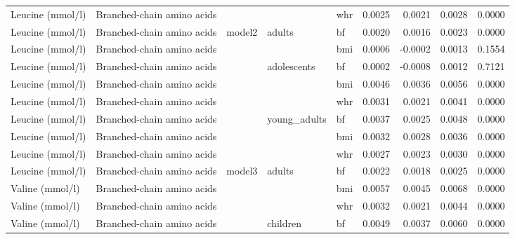 \documentclass[11pt,twoside]{bristolthesis}
\begin{document}
\begin{longtable}[t]{lllllrrrr}
\cmidrule{1-2}
\cmidrule{5-9}\nopagebreak
Leucine (mmol/l) & Branched-chain amino acids &  &  & whr & 0.0025 & 0.0021 & 0.0028 & 0.0000\\
\cmidrule{1-2}
\cmidrule{5-9}\nopagebreak
Leucine (mmol/l) & Branched-chain amino acids & \multirow{-11}{*}{\raggedright\arraybackslash model2} & \multirow{-3}{*}{\raggedright\arraybackslash adults} & bf & 0.0020 & 0.0016 & 0.0023 & 0.0000\\
\cmidrule{1-9}\pagebreak[0]
Leucine (mmol/l) & Branched-chain amino acids &  &  & bmi & 0.0006 & -0.0002 & 0.0013 & 0.1554\\
\cmidrule{1-2}
\cmidrule{5-9}\nopagebreak
Leucine (mmol/l) & Branched-chain amino acids &  & \multirow{-2}{*}{\raggedright\arraybackslash adolescents} & bf & 0.0002 & -0.0008 & 0.0012 & 0.7121\\
\cmidrule{1-2}
\cmidrule{4-9}\nopagebreak
Leucine (mmol/l) & Branched-chain amino acids &  &  & bmi & 0.0046 & 0.0036 & 0.0056 & 0.0000\\
\cmidrule{1-2}
\cmidrule{5-9}\nopagebreak
Leucine (mmol/l) & Branched-chain amino acids &  &  & whr & 0.0031 & 0.0021 & 0.0041 & 0.0000\\
\cmidrule{1-2}
\cmidrule{5-9}\nopagebreak
Leucine (mmol/l) & Branched-chain amino acids &  & \multirow{-3}{*}{\raggedright\arraybackslash young\_adults} & bf & 0.0037 & 0.0025 & 0.0048 & 0.0000\\
\cmidrule{1-2}
\cmidrule{4-9}\nopagebreak
Leucine (mmol/l) & Branched-chain amino acids &  &  & bmi & 0.0032 & 0.0028 & 0.0036 & 0.0000\\
\cmidrule{1-2}
\cmidrule{5-9}\nopagebreak
Leucine (mmol/l) & Branched-chain amino acids &  &  & whr & 0.0027 & 0.0023 & 0.0030 & 0.0000\\
\cmidrule{1-2}
\cmidrule{5-9}\nopagebreak
Leucine (mmol/l) & Branched-chain amino acids & \multirow{-8}{*}{\raggedright\arraybackslash model3} & \multirow{-3}{*}{\raggedright\arraybackslash adults} & bf & 0.0022 & 0.0018 & 0.0025 & 0.0000\\
\cmidrule{1-9}\pagebreak[0]
Valine (mmol/l) & Branched-chain amino acids &  &  & bmi & 0.0057 & 0.0045 & 0.0068 & 0.0000\\
\cmidrule{1-2}
\cmidrule{5-9}\nopagebreak
Valine (mmol/l) & Branched-chain amino acids &  &  & whr & 0.0032 & 0.0021 & 0.0044 & 0.0000\\
\cmidrule{1-2}
\cmidrule{5-9}\nopagebreak
Valine (mmol/l) & Branched-chain amino acids &  & \multirow{-3}{*}{\raggedright\arraybackslash children} & bf & 0.0049 & 0.0037 & 0.0060 & 0.0000\\

\end{longtable}
\end{document}
